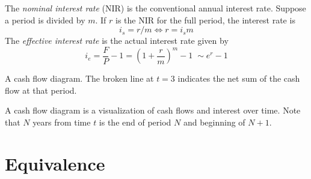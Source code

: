 \documentclass{tufte-book}
\begin{document}
\bigskip
{}
The \textit{nominal interest rate} (NIR) is the conventional annual interest rate. Suppose a period is divided by $m$. If $r$ is the NIR for the full period, the interest rate is
\begin{equation}
  i_s = r/m \iff r = i_s m
\end{equation}
The \textit{effective interest rate} is the actual interest rate given by \begin{equation}
  i_e = \frac{F}{P} - 1 = \left( 1 + \frac{r}{m} \right)^m - 1 \;\sim e^r - 1
\end{equation}
%
\begin{marginfigure}
  \begin{center}
     \phantom{mm}
  \end{center}
  \caption{A cash flow diagram. The broken line at $t=3$ indicates the net sum of the cash flow at that period.}
\end{marginfigure}
%
A cash flow diagram is a visualization of cash flows and interest over time. Note that $N$ years from time $t$ is the end of period $N$ and beginning of $N+1$.

\section{Equivalence}
\end{document}
